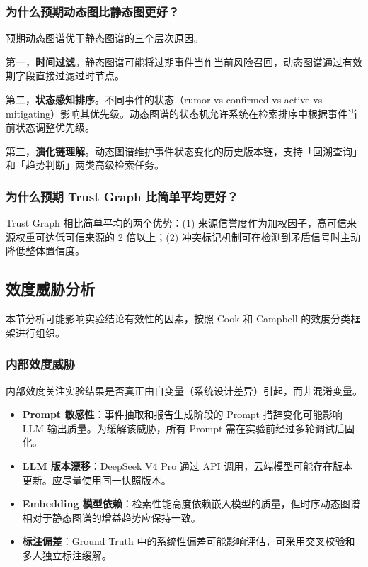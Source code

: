 \documentclass[12pt,a4paper]{article}
\newcommand{\term}[1]{\textbf{#1}}
\begin{document}
\subsubsection{为什么预期动态图比静态图更好？}

预期动态图谱优于静态图谱的三个层次原因。

第一，\textbf{时间过滤}。静态图谱可能将过期事件当作当前风险召回，动态图谱通过有效期字段直接过滤过时节点。

第二，\textbf{状态感知排序}。不同事件的状态（rumor vs confirmed vs active vs mitigating）影响其优先级。动态图谱的状态机允许系统在检索排序中根据事件当前状态调整优先级。

第三，\textbf{演化链理解}。动态图谱维护事件状态变化的历史版本链，支持「回溯查询」和「趋势判断」两类高级检索任务。

\subsubsection{为什么预期 Trust Graph 比简单平均更好？}

Trust Graph 相比简单平均的两个优势：(1) 来源信誉度作为加权因子，高可信来源权重可达低可信来源的 2 倍以上；(2) 冲突标记机制可在检测到矛盾信号时主动降低整体置信度。

\subsection{效度威胁分析}
\label{sec:exp-threats}

本节分析可能影响实验结论有效性的因素，按照 Cook 和 Campbell 的效度分类框架进行组织。

\subsubsection{内部效度威胁}

内部效度关注实验结果是否真正由自变量（系统设计差异）引起，而非混淆变量。

\begin{itemize}
    \item \term{Prompt 敏感性}：事件抽取和报告生成阶段的 Prompt 措辞变化可能影响 LLM 输出质量。为缓解该威胁，所有 Prompt 需在实验前经过多轮调试后固化。
    \item \term{LLM 版本漂移}：DeepSeek V4 Pro 通过 API 调用，云端模型可能存在版本更新。应尽量使用同一快照版本。
    \item \term{Embedding 模型依赖}：检索性能高度依赖嵌入模型的质量，但时序动态图谱相对于静态图谱的增益趋势应保持一致。
    \item \term{标注偏差}：Ground Truth 中的系统性偏差可能影响评估，可采用交叉校验和多人独立标注缓解。
\end{itemize}
\end{document}
